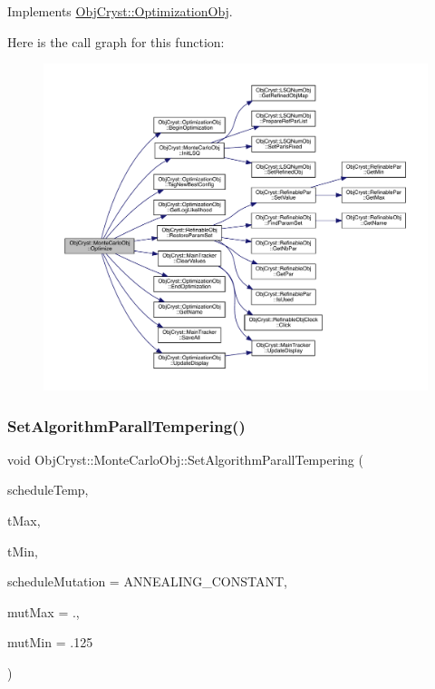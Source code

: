 Implements \mbox{\hyperlink{class_obj_cryst_1_1_optimization_obj_a08c77dc6ec80f63bf067ef2968a0b6dc}{Obj\+Cryst\+::\+Optimization\+Obj}}.

Here is the call graph for this function\+:
\nopagebreak
\begin{figure}[H]
\begin{center}
\leavevmode
\includegraphics[width=350pt]{class_obj_cryst_1_1_monte_carlo_obj_ad036c6dbffb9a65ae1a7545418f16c73_cgraph}
\end{center}
\end{figure}
\mbox{\label{class_obj_cryst_1_1_monte_carlo_obj_a54c7ad3cb78846c82c65d6a6db27801a}} 
\subsubsection{\texorpdfstring{SetAlgorithmParallTempering()}{SetAlgorithmParallTempering()}}
{\footnotesize\ttfamily void Obj\+Cryst\+::\+Monte\+Carlo\+Obj\+::\+Set\+Algorithm\+Parall\+Tempering (\begin{DoxyParamCaption}\item[{const Annealing\+Schedule}]{schedule\+Temp,  }\item[{const R\+E\+AL}]{t\+Max,  }\item[{const R\+E\+AL}]{t\+Min,  }\item[{const Annealing\+Schedule}]{schedule\+Mutation = {\ttfamily ANNEALING\+\_\+CONSTANT},  }\item[{const R\+E\+AL}]{mut\+Max = {.},  }\item[{const R\+E\+AL}]{mut\+Min = {\ttfamily .125} }\end{DoxyParamCaption})}



